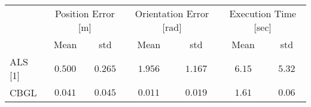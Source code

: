 
\vspace{0.5\baselineskip}



\begin{center}\vspace{0cm}
\setlength\tabcolsep{20px}
\begin{tabular}{@{}lcccccc@{}}
     & \multicolumn{2}{c}{Position Error {[}m{]}} & \multicolumn{2}{c}{Orientation Error {[}rad{]}} & \multicolumn{2}{c}{Execution Time {[}sec{]}} \\
     & Mean              & std              & Mean                & std                 & Mean                & std                \\ \midrule
  \textcolor[RGB]{145 74 0}{ALS [1]}  & \textcolor[RGB]{145 74 0}{$0.500$}          & \textcolor[RGB]{145 74 0}{$0.265$}         & \textcolor[RGB]{145 74 0}{$1.956$}            & \textcolor[RGB]{145 74 0}{$1.167$}            & \textcolor[RGB]{145 74 0}{$6.15$}             & \textcolor[RGB]{145 74 0}{$5.32$}            \\
  \textcolor[RGB]{0 71 145}{CBGL} & \textcolor[RGB]{0 71 145}{$\mathbf{0.041}$}          & \textcolor[RGB]{0 71 145}{$\mathbf{0.045}$}         & \textcolor[RGB]{0 71 145}{$\mathbf{0.011}$}            & \textcolor[RGB]{0 71 145}{$\mathbf{0.019}$}            & \textcolor[RGB]{0 71 145}{$\mathbf{1.61}$}             & \textcolor[RGB]{0 71 145}{$\mathbf{0.06}$}            \\ \bottomrule
\end{tabular}
\label{tbl:a}
\end{center}


\begin{center}
\end{center}


\begin{center}
\end{center}

